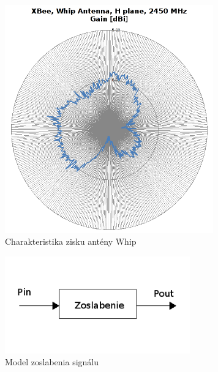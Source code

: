 \documentclass[11pt,twoside,a4paper]{book}
\begin{document}


\begin{figure}[htbp]
 \centering
 \includegraphics[width=9cm]{./figures/xbeeWhipGain.png}
 \caption{Charakteristika zisku antény Whip}
 \label{fig:xbeeWhipGain}
\end{figure}


\begin{figure}[htbp]
 \centering
 \includegraphics[width=8cm]{./figures/zoslabenie.png}
 \caption{Model zoslabenia signálu}
 \label{fig:zoslab}
\end{figure}


\end{document}
